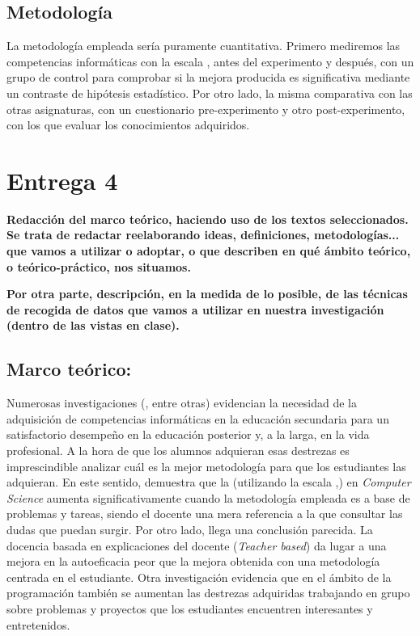 \documentclass[palatino]{apuntesURJC}
\begin{document}
\section{Metodología}

La metodología empleada sería puramente cuantitativa. 
%
Primero mediremos las competencias informáticas con la escala  \cite{CPSES}, antes del experimento y después, con un grupo de control para comprobar si la mejora producida es significativa mediante un contraste de hipótesis estadístico.
%
Por otro lado, la misma comparativa con las otras asignaturas, con un cuestionario pre-experimento y otro post-experimento, con los que evaluar los conocimientos adquiridos.

\chapter{Entrega 4}

\textbf{Redacción del marco teórico, haciendo uso de los textos seleccionados. Se trata de redactar reelaborando ideas, definiciones, metodologías... que vamos a utilizar o adoptar, o que describen en qué ámbito teórico, o teórico-práctico, nos situamos.}

\textbf{
Por otra parte, descripción, en la medida de lo posible, de las técnicas de recogida de datos que vamos a utilizar en nuestra investigación (dentro de las vistas en clase).
}

\section{Marco teórico:}

Numerosas investigaciones (\cite{CSIsImportant},\cite{CSArguing} entre otras) evidencian la necesidad de la adquisición de competencias informáticas en la educación secundaria para un satisfactorio desempeño en la educación posterior y, a la larga, en la vida profesional.
%
A la hora de que los alumnos adquieran esas destrezas es imprescindible analizar cuál es la mejor metodología para que los estudiantes las adquieran.
%
En este sentido, \cite{StudentCenter} demuestra que la  (utilizando la escala ,\cite{CPSES}) en \textit{Computer Science} aumenta significativamente cuando la metodología empleada es a base de problemas y tareas, siendo el docente una mera referencia a la que consultar las dudas que puedan surgir.
%
\label{studentbased}
%
Por otro lado, \cite{StudentCenterVSLectures} llega una conclusión parecida. 
%
La docencia basada en explicaciones del docente (\textit{Teacher based}) da lugar a una mejora en la autoeficacia peor que la mejora obtenida con una metodología centrada en el estudiante.
%
\label{groupsbased}
%
Otra investigación \cite{ABPCS} evidencia que en el ámbito de la programación también se aumentan las destrezas adquiridas trabajando en grupo sobre problemas y proyectos que los estudiantes encuentren interesantes y entretenidos. 
\end{document}
